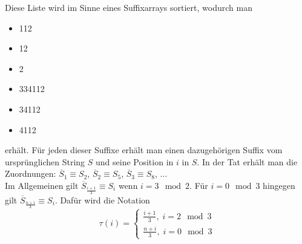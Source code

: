 \documentclass[a4paper, 12pt]{article}
\theoremstyle{plain}
\theoremstyle{definition}
\theoremstyle{lemma}
\theoremstyle{remark}
\theoremstyle{corollary}
\theoremstyle{example}
\begin{document}
	Diese Liste wird im Sinne eines Suffixarrays sortiert, wodurch man \begin{itemize}
		\item 112
		\item 12
		\item 2
		\item 334112
		\item 34112
		\item 4112
	\end{itemize} 
	erhält. Für jeden dieser Suffixe erhält man einen dazugehörigen Suffix vom ursprünglichen String $S$ und seine Position in $i$ in $S$. In der Tat erhält man die Zuordnungen: $\overline{S}_1 \equiv S_2$, $\overline{S}_2 \equiv S_5$, $\overline{S}_3 \equiv S_8$, ... \\
	Im Allgemeinen gilt $\overline{S}_{\frac{i+1}{3}} \equiv S_i$ wenn $i = 3 \mod 2$. Für $i = 0 \mod 3$ hingegen gilt $\overline{S}_{\frac{n+i}{3}} \equiv S_i$. Dafür wird die Notation \[\tau(i) = \begin{cases}
		\frac{i+1}{3}, \; i = 2 \mod 3\\
		\frac{n+i}{3}, \; i = 0 \mod 3
	\end{cases}\]
	
\end{document}
